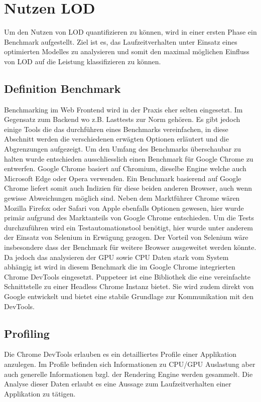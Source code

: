 \section{Nutzen LOD}
Um den Nutzen von LOD quantifizieren zu können, wird in einer ersten Phase ein Benchmark aufgestellt.
Ziel ist es, das Laufzeitverhalten unter Einsatz eines optimierten Modelles zu analysieren und somit den maximal möglichen Einfluss von LOD auf die Leistung klassifizieren zu können.

\subsection{Definition Benchmark}
Benchmarking im Web Frontend wird in der Praxis eher selten eingesetzt. Im Gegensatz zum Backend wo z.B. Lasttests zur Norm gehören.
Es gibt jedoch einige Tools die das durchführen eines Benchmarks vereinfachen, in diese Abschnitt werden die verschiedenen erwägten Optionen erläutert und die Abgrenzungen aufgezeigt.
Um den Umfang des Benchmarks überschaubar zu halten wurde entschieden ausschliesslich einen Benchmark für Google Chrome zu entwerfen.
Google Chrome basiert auf Chromium, dieselbe Engine welche auch Microsoft Edge oder Opera verwenden.
Ein Benchmark basierend auf Google Chrome liefert somit auch Indizien für diese beiden anderen Browser, auch wenn gewisse Abweichungen möglich sind.
Neben dem Marktführer Chrome wären Mozilla Firefox oder Safari von Apple ebenfalls Optionen gewesen, hier wurde primär aufgrund des Marktanteils von Google Chrome entschieden.
Um die Tests durchzuführen wird ein Testautomationstool benötigt, hier wurde unter anderem der Einsatz von Selenium in Erwägung gezogen.
Der Vorteil von Selenium wäre insbesondere dass der Benchmark für weitere Browser ausgeweitet werden könnte.
Da jedoch das analysieren der GPU sowie CPU Daten stark vom System abhängig ist wird in diesem Benchmark die im Google Chrome integrierten Chrome DevTools eingesetzt.
Puppeteer ist eine Bibliothek die eine vereinfachte Schnittstelle zu einer Headless Chrome Instanz bietet.
Sie wird zudem direkt von Google entwickelt und bietet eine stabile Grundlage zur Kommunikation mit den DevTools.

\subsection{Profiling}
Die Chrome DevTools erlauben es ein detailliertes Profile einer Applikation anzulegen.
Im Profile befinden sich Informationen zu CPU/GPU Auslastung aber auch generelle Informationen bzgl. der Rendering Engine werden gesammelt.
Die Analyse dieser Daten erlaubt es eine Aussage zum Laufzeitverhalten einer Applikation zu tätigen.

